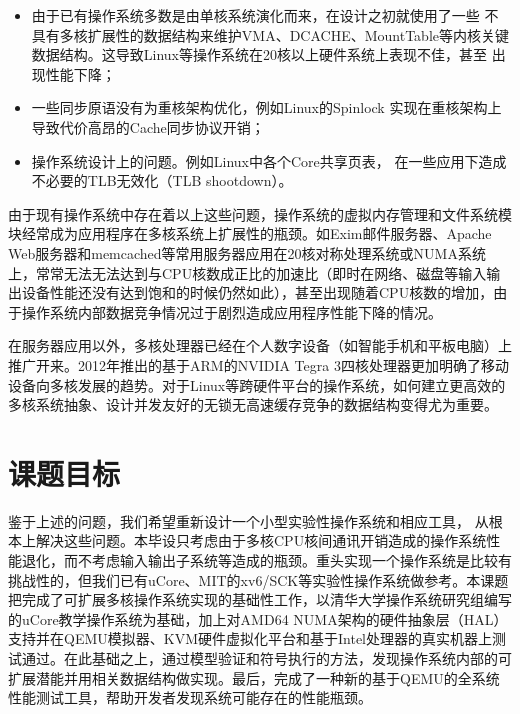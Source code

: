 	\begin{itemize}
		\item
	由于已有操作系统多数是由单核系统演化而来，在设计之初就使用了一些
	不具有多核扩展性的数据结构来维护VMA、DCACHE、MountTable等内核关键
	数据结构。这导致Linux等操作系统在20核以上硬件系统上表现不佳，甚至
	出现性能下降\cite{linux:osdi10}；
		\item 一些同步原语没有为重核架构优化，例如Linux的Spinlock
			实现在重核架构上导致代价高昂的Cache同步协议开销；
		\item
			操作系统设计上的问题。例如Linux中各个Core共享页表，
			在一些应用下造成不必要的TLB无效化（TLB shootdown）。
	\end{itemize}

由于现有操作系统中存在着以上这些问题，操作系统的虚拟内存管理和文件系统模块经常成为应用程序在多核系统上扩展性的瓶颈。如Exim邮件服务器、Apache
Web服务器和memcached等常用服务器应用在20核对称处理系统或NUMA系统上，常常无法无法达到与CPU核数成正比的加速比（即时在网络、磁盘等输入输出设备性能还没有达到饱和的时候仍然如此），甚至出现随着CPU核数的增加，由于操作系统内部数据竞争情况过于剧烈造成应用程序性能下降的情况\cite{linux:osdi10}。

在服务器应用以外，多核处理器已经在个人数字设备（如智能手机和平板电脑）上推广开来。2012年推出的基于ARM的NVIDIA
Tegra
3四核处理器更加明确了移动设备向多核发展的趋势。对于Linux等跨硬件平台的操作系统，如何建立更高效的多核系统抽象、设计并发友好的无锁无高速缓存竞争的数据结构变得尤为重要。

\section{课题目标}

	鉴于上述的问题，我们希望重新设计一个小型实验性操作系统和相应工具，
	从根本上解决这些问题。本毕设只考虑由于多核CPU核间通讯开销造成的操作系统性能退化，而不考虑输入输出子系统等造成的瓶颈。重头实现一个操作系统是比较有挑战性的，但我们已有uCore、MIT的xv6/SCK等实验性操作系统做参考。本课题把完成了可扩展多核操作系统实现的基础性工作，以清华大学操作系统研究组编写的uCore教学操作系统为基础，加上对AMD64
	NUMA架构的硬件抽象层（HAL）支持并在QEMU模拟器、KVM硬件虚拟化平台和基于Intel处理器的真实机器上测试通过。在此基础之上，通过模型验证和符号执行的方法，发现操作系统内部的可扩展潜能并用相关数据结构做实现。最后，完成了一种新的基于QEMU的全系统性能测试工具，帮助开发者发现系统可能存在的性能瓶颈。


